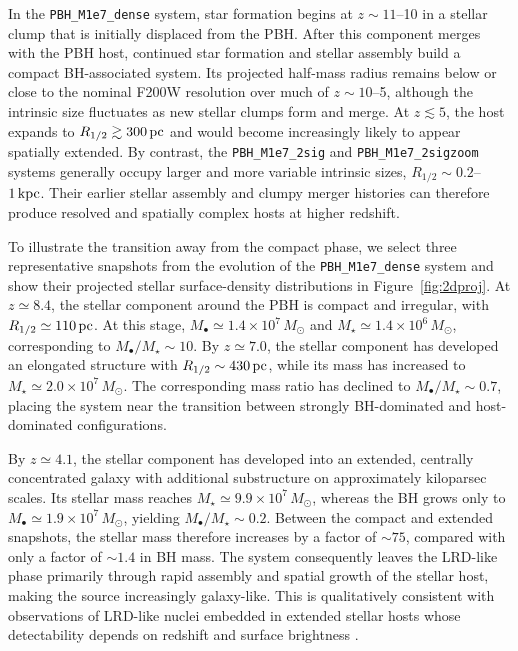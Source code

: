 \documentclass[twocolumn,trackchanges]{aastex701}
\begin{document}
In the \texttt{PBH\_M1e7\_dense} system, star formation begins at
$z\sim11$--10 in a stellar clump that is initially displaced from the PBH. After this component merges with the PBH host, continued star formation and stellar assembly build a compact BH-associated system. Its projected half-mass radius remains below or close to the nominal F200W resolution over much of $z\sim10$--5, although the intrinsic size fluctuates as new stellar clumps form and merge. At $z\lesssim5$, the host expands to $R_{1/2}\gtrsim300\,{\rm pc}$ and would become increasingly likely to appear spatially extended. By contrast, the \texttt{PBH\_M1e7\_2sig} and \texttt{PBH\_M1e7\_2sigzoom} systems generally occupy larger and more variable intrinsic sizes, $R_{1/2}\sim0.2$--$1\,{\rm kpc}$. Their earlier stellar assembly and clumpy merger histories can therefore produce resolved and spatially complex hosts at higher redshift.

To illustrate the transition away from the compact phase, we select three representative snapshots from the evolution of the \texttt{PBH\_M1e7\_dense} system and show their projected stellar surface-density distributions in Figure~\ref{fig:2dproj}. At $z\simeq8.4$, the stellar component around the PBH is compact and irregular, with $R_{1/2}\simeq110\,{\rm pc}$. At this stage, $M_\bullet\simeq1.4\times10^7\,M_\odot$ and $M_\star\simeq1.4\times10^6\,M_\odot$, corresponding to $M_\bullet/M_\star\sim10$. By $z\simeq7.0$, the stellar component has developed an elongated structure with $R_{1/2}\sim430\,{\rm pc}$, while its mass has increased to $M_\star\simeq2.0\times10^7\,M_\odot$. The corresponding mass ratio has declined to $M_\bullet/M_\star\sim0.7$, placing the system near the transition between strongly BH-dominated and host-dominated configurations.

By $z\simeq4.1$, the stellar component has developed into an extended, centrally concentrated galaxy with additional substructure on approximately kiloparsec scales. Its stellar mass reaches $M_\star\simeq9.9\times10^7\,M_\odot$, whereas the BH grows only to $M_\bullet\simeq1.9\times10^7\,M_\odot$, yielding $M_\bullet/M_\star\sim0.2$. Between the compact and extended snapshots, the stellar mass therefore increases by a factor of $\sim75$, compared with only a factor of $\sim1.4$ in BH mass. The system consequently leaves the LRD-like phase primarily through rapid assembly and spatial growth of the stellar host, making the source increasingly galaxy-like. This is qualitatively consistent with observations of LRD-like nuclei embedded in extended stellar hosts whose detectability depends on redshift and surface brightness \citep[e.g.,][]{Rinaldi2026ApJLRD}.
\end{document}
